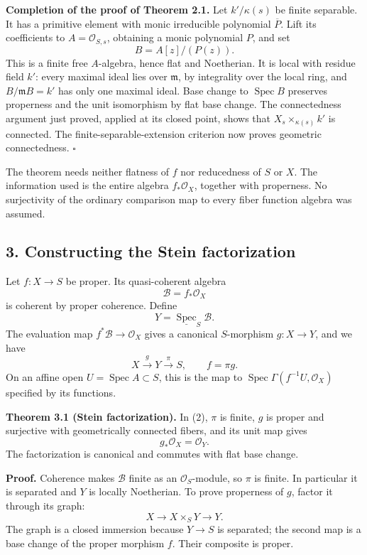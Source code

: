 \documentclass[11pt]{article}
\begin{document}
\textbf{Completion of the proof of Theorem 2.1.} Let \(k'/\kappa(s)\) be
finite separable. It has a primitive element with monic irreducible
polynomial \(\overline P\). Lift its coefficients to
\(A=\mathcal O_{S,s}\), obtaining a monic polynomial \(P\), and set \[
B=A[z]/(P(z)).
\] This is a finite free \(A\)-algebra, hence flat and Noetherian. It is
local with residue field \(k'\): every maximal ideal lies over
\(\mathfrak m\), by integrality over the local ring, and
\(B/\mathfrak mB=k'\) has only one maximal ideal. Base change to
\(\operatorname{Spec}B\) preserves properness and the unit isomorphism
by flat base change. The connectedness argument just proved, applied at
its closed point, shows that \(X_s\times_{\kappa(s)}k'\) is connected.
The finite-separable-extension criterion now proves geometric
connectedness. \(\square\)

The theorem needs neither flatness of \(f\) nor reducedness of \(S\) or
\(X\). The information used is the entire algebra \(f_*\mathcal O_X\),
together with properness. No surjectivity of the ordinary comparison map
to every fiber function algebra was assumed.

\subsection{3. Constructing the Stein
factorization}\label{constructing-the-stein-factorization}

Let \(f:X\to S\) be proper. Its quasi-coherent algebra \[
\mathcal B=f_*\mathcal O_X
\] is coherent by proper coherence. Define \[
Y=\underline{\operatorname{Spec}}_S\mathcal B.
\] The evaluation map \(f^*\mathcal B\to\mathcal O_X\) gives a canonical
\(S\)-morphism \(g:X\to Y\), and we have \[
X\xrightarrow{g}Y\xrightarrow{\pi}S,\qquad f=\pi g.
\tag{2}
\] On an affine open \(U=\operatorname{Spec}A\subset S\), this is the
map to \(\operatorname{Spec}\Gamma(f^{-1}U,\mathcal O_X)\) specified by
its functions.

\textbf{Theorem 3.1 (Stein factorization).} In (2), \(\pi\) is finite,
\(g\) is proper and surjective with geometrically connected fibers, and
its unit map gives \[
g_*\mathcal O_X=\mathcal O_Y.
\] The factorization is canonical and commutes with flat base change.

\textbf{Proof.} Coherence makes \(\mathcal B\) finite as an
\(\mathcal O_S\)-module, so \(\pi\) is finite. In particular it is
separated and \(Y\) is locally Noetherian. To prove properness of \(g\),
factor it through its graph: \[
X\longrightarrow X\times_S Y\longrightarrow Y.
\] The graph is a closed immersion because \(Y\to S\) is separated; the
second map is a base change of the proper morphism \(f\). Their
composite is proper.
\end{document}
